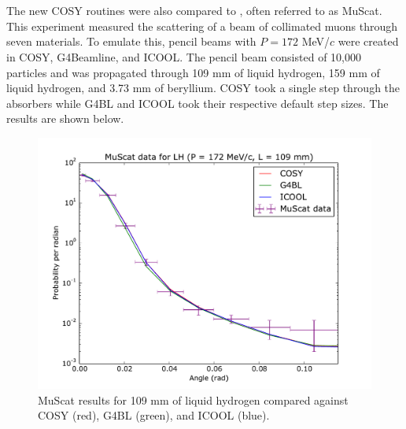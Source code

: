 \begin{center}
\frame{    }\\
\frame{}\\
\frame{      }\\
\frame{    }\\
\frame{}\\
\frame{      }\\
\frame{    }\\
\frame{}
\end{center}

\fi

\label{sec:validation}

The new COSY routines were also compared to \cite{muscat}, often referred to as MuScat. This experiment measured the scattering of a beam of collimated muons through seven materials. To emulate this, pencil beams with $P=172$ MeV/$c$ were created in COSY, G4Beamline, and ICOOL. The pencil beam consisted of 10,000 particles and was propagated through 109 mm of liquid hydrogen, 159 mm of liquid hydrogen, and 3.73 mm of beryllium. COSY took a single step through the absorbers while G4BL and ICOOL took their respective default step sizes. The results are shown below.

\begin{figure}[H]
  \centering
    \includegraphics[width=\textwidth]{Figures/172.109.muscat} 
  \caption{MuScat results for 109 mm of liquid hydrogen compared against COSY (red), G4BL (green), and ICOOL (blue).}
  \label{fig:172.109.muscat}
\end{figure}

